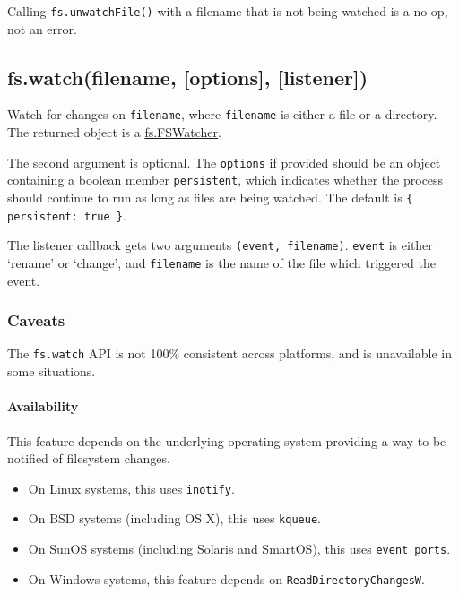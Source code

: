 Calling \texttt{fs.unwatchFile()} with a filename that is not being
watched is a no-op, not an error.

\subsection{fs.watch(filename, {[}options{]}, {[}listener{]})}

\begin{Shaded}
\begin{Highlighting}[]
\NormalTok{: } \NormalTok{- }
\end{Highlighting}
\end{Shaded}

Watch for changes on \texttt{filename}, where \texttt{filename} is
either a file or a directory. The returned object is a
\hyperref[fs\_class\_fs\_fswatcher]{fs.FSWatcher}.

The second argument is optional. The \texttt{options} if provided should
be an object containing a boolean member \texttt{persistent}, which
indicates whether the process should continue to run as long as files
are being watched. The default is \texttt{\{ persistent: true \}}.

The listener callback gets two arguments \texttt{(event, filename)}.
\texttt{event} is either `rename' or `change', and \texttt{filename} is
the name of the file which triggered the event.

\subsubsection{Caveats}

The \texttt{fs.watch} API is not 100\% consistent across platforms, and
is unavailable in some situations.

\paragraph{Availability}

This feature depends on the underlying operating system providing a way
to be notified of filesystem changes.

\begin{itemize}
\item
  On Linux systems, this uses \texttt{inotify}.
\item
  On BSD systems (including OS X), this uses \texttt{kqueue}.
\item
  On SunOS systems (including Solaris and SmartOS), this uses
  \texttt{event ports}.
\item
  On Windows systems, this feature depends on
  \texttt{ReadDirectoryChangesW}.
\end{itemize}

